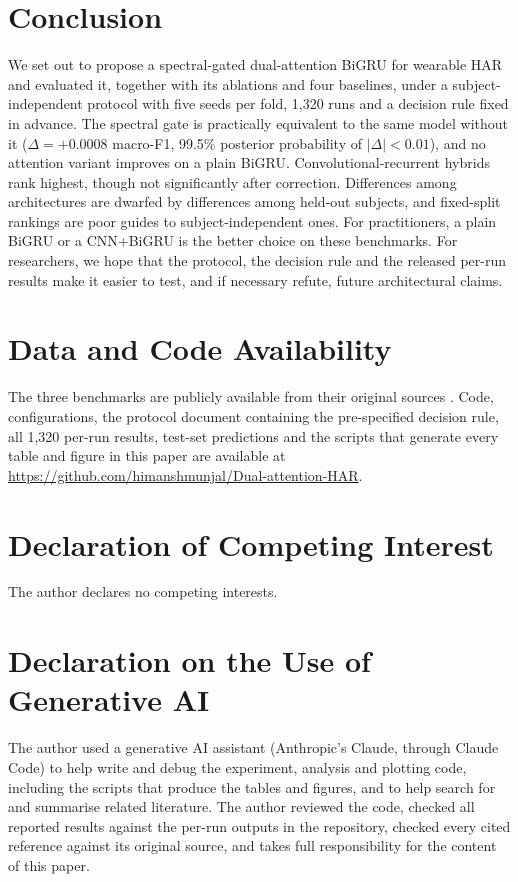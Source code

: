 \documentclass[11pt,a4paper]{article}
\begin{document}
\section{Conclusion}
We set out to propose a spectral-gated dual-attention BiGRU for wearable HAR and evaluated it, together with its ablations and four baselines, under a subject-independent protocol with five seeds per fold, 1{,}320 runs and a decision rule fixed in advance. The spectral gate is practically equivalent to the same model without it ($\Delta=+0.0008$ macro-F1, 99.5\% posterior probability of $|\Delta|<0.01$), and no attention variant improves on a plain BiGRU. Convolutional-recurrent hybrids rank highest, though not significantly after correction. Differences among architectures are dwarfed by differences among held-out subjects, and fixed-split rankings are poor guides to subject-independent ones. For practitioners, a plain BiGRU or a CNN+BiGRU is the better choice on these benchmarks. For researchers, we hope that the protocol, the decision rule and the released per-run results make it easier to test, and if necessary refute, future architectural claims.

\section*{Data and Code Availability}
The three benchmarks are publicly available from their original sources \cite{anguita2013public,kwapisz2011activity,reiss2012introducing}. Code, configurations, the protocol document containing the pre-specified decision rule, all 1{,}320 per-run results, test-set predictions and the scripts that generate every table and figure in this paper are available at \url{https://github.com/himanshmunjal/Dual-attention-HAR}.

\section*{Declaration of Competing Interest}
The author declares no competing interests.

\section*{Declaration on the Use of Generative AI}
The author used a generative AI assistant (Anthropic's Claude, through Claude Code) to help write and debug the experiment, analysis and plotting code, including the scripts that produce the tables and figures, and to help search for and summarise related literature. The author reviewed the code, checked all reported results against the per-run outputs in the repository, checked every cited reference against its original source, and takes full responsibility for the content of this paper.
\end{document}
